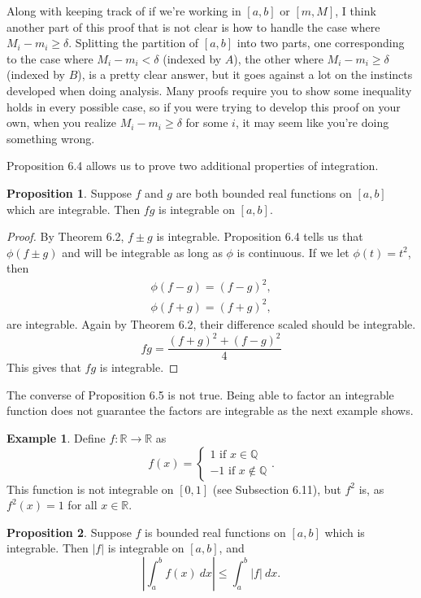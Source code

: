 \documentclass{article}
\newcommand{\R}{\mathbb{R}}
\newcommand{\Q}{\mathbb{Q}}
\theoremstyle{definition}
\newtheorem{proposition}{Proposition}[section]
\newtheorem{example}{Example}[section]
\begin{document}
Along with keeping track of if we're working in $ [a,b] $ or $ [m,M] $, I think another part of this proof that is not clear is how to handle the case where $ M_i-m_i\ge\delta $. Splitting the partition of $ [a,b] $ into two parts, one corresponding to the case where $  M_i-m_i<\delta $ (indexed by $ A $), the other where $  M_i-m_i\ge\delta $ (indexed by $ B $), is a pretty clear answer, but it goes against a lot on the instincts developed when doing analysis. Many proofs require you to show some inequality holds in every possible case, so if you were trying to develop this proof on your own, when you realize $  M_i-m_i\ge\delta $ for some $ i $, it may seem like you're doing something wrong.

Proposition 6.4 allows us to prove two additional properties of integration.
\begin{proposition}
	Suppose $ f $ and $ g $ are both bounded real functions on $ [a,b] $ which are integrable. Then $ fg $ is integrable on $ [a,b] $.
\end{proposition}
\begin{proof}
	By Theorem 6.2, $ f\pm g $ is integrable. Proposition 6.4 tells us that $ \phi(f\pm g) $ and will be integrable as long as $ \phi $ is continuous. If we let $ \phi(t)=t^2 $, then \begin{align*}
		\phi(f-g)=(f-g)^2,\\\phi(f+g)=(f+g)^2,
	\end{align*} are integrable. Again by Theorem 6.2, their difference scaled should be integrable. $$fg=\frac{(f+g)^2+(f-g)^2}{4} $$ This gives that $ fg $ is integrable. 
\end{proof}
The converse of Proposition 6.5 is not true. Being able to factor an integrable function does not guarantee the factors are integrable as the next example shows.
\begin{example}
	Define $ f:\R\to\R $ as $$f(x)=\begin{cases}
	1\text{ if }x\in\Q\\-1\text{ if }x\notin\Q
	\end{cases}. $$ 
This function is not integrable on $ [0,1] $ (see Subsection 6.11), but $ f^2 $ is, as $ f^2(x)=1 $ for all $ x\in\R $. 	
\end{example}
\begin{proposition}
	Suppose $ f $ is bounded real functions on $ [a,b] $ which is integrable. Then $ |f| $ is integrable on $ [a,b] $, and $$\left\lvert\int_{a}^{b}f(x)\ dx \right\rvert\le \int_{a}^{b}|f|\ dx. $$
\end{proposition}
\end{document}
